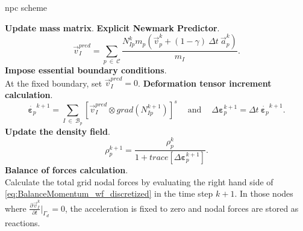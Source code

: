 \documentclass[preprint,12pt,a4paper]{elsarticle}
\newcommand{\tens}[1]{
  \ensuremath{\mathbf{{#1}}}
}
\newcommand\Grad[1]{grad({#1})}
\newcommand{\Deriv}[3][]{
  \ensuremath{\frac{\partial^{#1}{#2}}{ \partial {#3}^{#1} }}
}
\begin{document}
\begin{algorithm}
\caption{\acrfull{npc} scheme}
\label{alg:the_npc_alg}
  \begin{algorithmic}[1]
    \STATE \textbf{Update mass matrix}.
    \STATE \textbf{Explicit Newmark Predictor}.\\
    \begin{equation*}
      \vec{v}_I^{pred} = \sum_{p\ \in\ \mathcal{C}} \frac{ N_{Ip}^{k} m_p (\vec{v}_p^k + (1 - \gamma)\ \Delta t\ \vec{a}_p^k)}{m_I}.
    \end{equation*}
    \STATE \textbf{Impose essential boundary conditions}.\\
    At the fixed boundary, set $\vec{v}_{I}^{pred} = 0$. 
    \STATE \textbf{Deformation tensor increment calculation}.
    \begin{equation*}
      \dot{\tens{\varepsilon}_{p}}^{k+1} = \sum_{I\ \in\ \mathcal{B}_p} \left[ \vec{v}_{I}^{pred} \otimes \Grad{N_{Ip}^{k+1}} \right]^s\ \quad \text{and}\ \quad \Delta \tens{\varepsilon}_{p}^{k+1} = \Delta t\ \dot{\tens{\varepsilon}_{p}}^{k+1}.
    \end{equation*}
    \STATE \textbf{Update the density field}.
    \begin{equation*}
      \rho_p^{k+1} = \frac{\rho_p^k}{1 + \mathit{trace}\left[\Delta\tens{\varepsilon}_{p}^{k+1}\right]}.
    \end{equation*}
    \STATE \textbf{Balance of forces calculation}.\\
    Calculate the total grid nodal forces by evaluating the right hand side of 
    \eqref{eq:BalanceMomentum_wf_discretized} in the time step $k+1$.
    In those nodes where $\Deriv{\vec{v}_I^{k}}{t} \big\rvert_{\Gamma_d} = 0$, the acceleration is fixed to zero and nodal forces are stored as reactions.\\

\end{algorithmic}
\end{algorithm}
\end{document}
